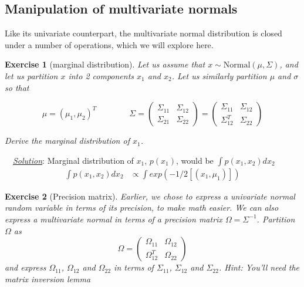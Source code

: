 \documentclass[twoside]{article}
\newcounter{lecnum}
\newtheorem{exercise}{Exercise}[lecnum]
\newenvironment{solution}{
  \begin{flushleft} \noindent ~~\underline{\emph{Solution}}: \rmfamily}{\end{flushleft}}
\begin{document}
\subsection{Manipulation of multivariate normals}
Like its univariate counterpart, the multivariate normal distribution is closed under a number of operations, which we will explore here.

\begin{exercise}[marginal distribution]
  Let us assume that $x\sim \mbox{Normal}(\mu, \Sigma)$, and let us partition $x$ into 2 components $x_1$ and $x_2$. Let us similarly partition $\mu$ and $\sigma$ so that

  $$\mu  = (\mu_1, \mu_2)^T \qquad \qquad \Sigma = \begin{pmatrix}\Sigma_{11} & \Sigma_{12} \\ \Sigma_{21} & \Sigma_{22}\end{pmatrix} = \begin{pmatrix}\Sigma_{11} & \Sigma_{12} \\ \Sigma_{12}^T & \Sigma_{22}\end{pmatrix}$$

  Derive the marginal distribution of $x_1$.
\end{exercise}

\begin{solution}
Marginal distribution of $x_1$, $p(x_1)$, would be $\int p(x_1, x_2) dx_2$
\begin{equation*}
\begin{split}
\int p(x_1, x_2) dx_2 & \propto \int exp(-1/2 [(x_1, \mu_1)]) 
\end{split}
\end{equation*}
\end{solution}

\begin{exercise}[Precision matrix]
  Earlier, we chose to express a univariate normal random variable in terms of its precision, to make math easier. We can also express a multivariate normal in terms of a precision matrix $\Omega = \Sigma^{-1}$. Partition $\Omega$ as
  $$\Omega = \begin{pmatrix}\Omega_{11} & \Omega_{12} \\ \Omega_{12}^T & \Omega_{22}\end{pmatrix}$$
  and express $\Omega_{11}$, $\Omega_{12}$ and $\Omega_{22}$ in terms of $\Sigma_{11}$, $\Sigma_{12}$ and $\Sigma_{22}$. \textit{Hint: You'll need the matrix inversion lemma}
\end{exercise}
\end{document}
